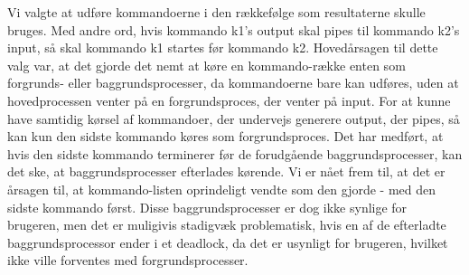 Vi valgte at udføre kommandoerne i den rækkefølge som resultaterne skulle bruges.
Med andre ord, hvis kommando k1's output skal pipes til kommando k2's input, så skal kommando k1 startes før kommando k2.
Hovedårsagen til dette valg var, at det gjorde det nemt at køre en kommando-række enten som forgrunds- eller baggrundsprocesser, da kommandoerne bare kan udføres, uden at hovedprocessen venter på en forgrundsproces, der venter på input. For at kunne have samtidig kørsel af kommandoer, der undervejs generere output, der pipes, så kan kun den sidste kommando køres som forgrundsproces. Det har medført, at hvis den sidste kommando terminerer før de forudgående baggrundsprocesser, kan det ske, at baggrundsprocesser efterlades kørende. Vi er nået frem til, at det er årsagen til, at kommando-listen oprindeligt vendte som den gjorde - med den sidste kommando først. Disse baggrundsprocesser er dog ikke synlige for brugeren, men det er muligivis stadigvæk problematisk, hvis en af de efterladte baggrundsprocessor ender i et deadlock, da det er usynligt for brugeren, hvilket ikke ville forventes med forgrundsprocesser.
